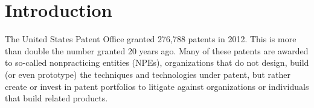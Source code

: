\section{Introduction}
The United States Patent Office granted 276,788 patents in 2012\cite{USPTO:2013:stats}. This is more than double the number granted 20 years ago. Many of these patents are awarded to so-called nonpracticing entities (NPEs), organizations that do not design, build (or even prototype) the techniques and technologies under patent, but rather create or invest in patent portfolios to litigate against organizations or individuals that build related products.




